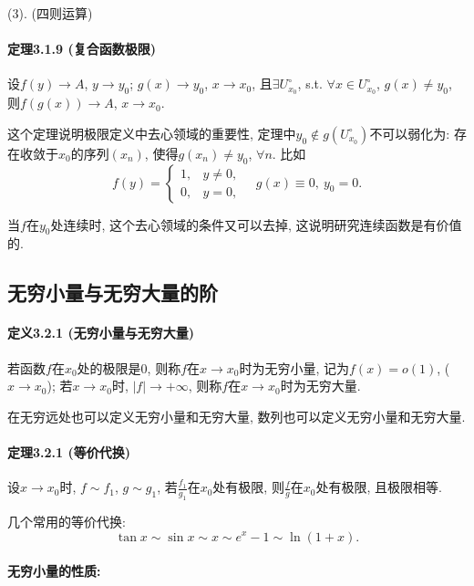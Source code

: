 (3). (四则运算)

\paragraph{定理3.1.9 (复合函数极限)}

设$f(y)\to A$, $y\to y_{0}$; $g(x)\to y_{0}$, $x\to x_{0}$, 且$\exists U_{x_{0}}^{\circ}$,
s.t. $\forall x\in U_{x_{0}}^{\circ}$, $g(x)\ne y_{0}$, 则$f(g(x))\to A$,
$x\to x_{0}$.

这个定理说明极限定义中去心领域的重要性, 定理中$y_{0}\not\in g(U_{x_{0}}^{\circ})$不可以弱化为:
存在收敛于$x_{0}$的序列$\left(x_{n}\right)$, 使得$g(x_{n})\ne y_{0}$, $\forall n$.
比如
\[
f(y)=\begin{cases}
1, & y\ne0,\\
0, & y=0,
\end{cases}\quad g(x)\equiv0,\ y_{0}=0.
\]

当$f$在$y_{0}$处连续时, 这个去心领域的条件又可以去掉, 这说明研究连续函数是有价值的.

\subsection{无穷小量与无穷大量的阶}

\paragraph{定义3.2.1 (无穷小量与无穷大量)}

若函数$f$在$x_{0}$处的极限是$0$, 则称$f$在$x\to x_{0}$时为无穷小量, 记为$f(x)=o(1)$,
($x\to x_{0}$); 若$x\to x_{0}$时, $\left|f\right|\to+\infty$, 则称$f$在$x\to x_{0}$时为无穷大量.

在无穷远处也可以定义无穷小量和无穷大量, 数列也可以定义无穷小量和无穷大量.

\paragraph{定理3.2.1 (等价代换)}

设$x\to x_{0}$时, $f\sim f_{1}$, $g\sim g_{1}$, 若$\frac{f_{1}}{g_{1}}$在$x_{0}$处有极限,
则$\frac{f}{g}$在$x_{0}$处有极限, 且极限相等.

几个常用的等价代换:
\[
\tan x\sim\sin x\sim x\sim e^{x}-1\sim\ln(1+x).
\]


\paragraph{无穷小量的性质:}

